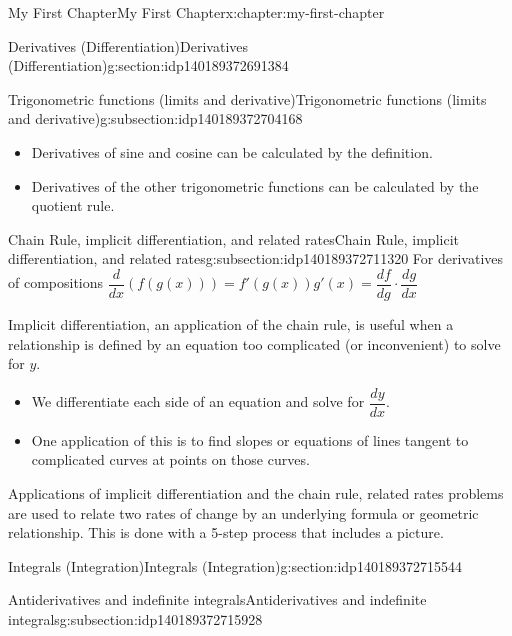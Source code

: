 \documentclass[oneside,10pt,]{book}
\begin{document}
\begin{chapterptx}{My First Chapter}{}{My First Chapter}{}{}{x:chapter:my-first-chapter}
\begin{sectionptx}{Derivatives (Differentiation)}{}{Derivatives (Differentiation)}{}{}{g:section:idp140189372691384}
\begin{subsectionptx}{Trigonometric functions (limits and derivative)}{}{Trigonometric functions (limits and derivative)}{}{}{g:subsection:idp140189372704168}
\begin{itemize}[label=\textbullet]
\item{}Derivatives of sine and cosine can be calculated by the definition.%
\item{}Derivatives of the other trigonometric functions can be calculated by the quotient rule.%
\end{itemize}
\end{subsectionptx}
%
%
\typeout{************************************************}
\typeout{************************************************}
%
\begin{subsectionptx}{Chain Rule, implicit differentiation, and related rates}{}{Chain Rule, implicit differentiation, and related rates}{}{}{g:subsection:idp140189372711320}
For derivatives of compositions \(\displaystyle \dfrac{d}{dx}\left(f(g(x))\right) = f'(g(x))g'(x) = \dfrac{df}{dg}\cdot\dfrac{dg}{dx}\)%
\par
Implicit differentiation, an application of the chain rule, is useful when a relationship is defined by an equation too complicated (or inconvenient) to solve for \(y\).%
\begin{itemize}[label=\textbullet]
\item{}We differentiate each side of an equation and solve for \(\dfrac{dy}{dx}\).%
\item{}One application of this is to find slopes or equations of lines tangent to complicated curves at points on those curves.%
\end{itemize}
%
\par
Applications of implicit differentiation and the chain rule, related rates problems are used to relate two rates of change by an underlying formula or geometric relationship.  This is done with a 5-step process that includes a picture.%
\end{subsectionptx}
\end{sectionptx}
%
%
\typeout{************************************************}
\typeout{************************************************}
%
\begin{sectionptx}{Integrals (Integration)}{}{Integrals (Integration)}{}{}{g:section:idp140189372715544}
%
%
\typeout{************************************************}
\typeout{************************************************}
%
\begin{subsectionptx}{Antiderivatives and indefinite integrals}{}{Antiderivatives and indefinite integrals}{}{}{g:subsection:idp140189372715928}

\end{subsectionptx}
\end{sectionptx}
\end{chapterptx}
\end{document}
